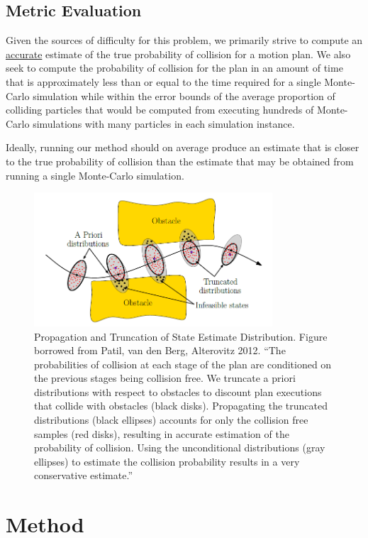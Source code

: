 \documentclass[journal]{IEEEtran}
\begin{document}

\subsection{Metric Evaluation}
Given the sources of difficulty for this problem, we primarily strive to compute an \underline{accurate} estimate of the true probability of collision for a motion plan. We also seek to compute the probability of collision for the plan in an amount of time that is approximately less than or equal to the time required for a single Monte-Carlo simulation while within the error bounds of the average proportion of colliding particles that would be computed from executing hundreds of Monte-Carlo simulations with many particles in each simulation instance.

Ideally, running our method should on average produce an estimate that is closer to the true probability of collision than the estimate that may be obtained from running a single Monte-Carlo simulation.

\begin{figure}[!t]
\centering
\includegraphics[width=3.5in]{motion_pic.PNG}
\caption{Propagation and Truncation of State Estimate Distribution. Figure borrowed from Patil, van den Berg, Alterovitz 2012. ``The probabilities of collision at each stage of the plan are conditioned on the previous stages being collision free. We truncate a priori distributions with respect to obstacles to discount plan executions that collide with obstacles (black disks). Propagating the truncated distributions (black ellipses) accounts for only the collision free samples (red disks), resulting in accurate estimation of the probability of collision. Using the unconditional distributions (gray ellipses) to estimate the collision probability results in a very conservative estimate.''\cite{IEEEhowto:patil}}
\label{patil_figure}
\end{figure}

\section{Method}
\end{document}
